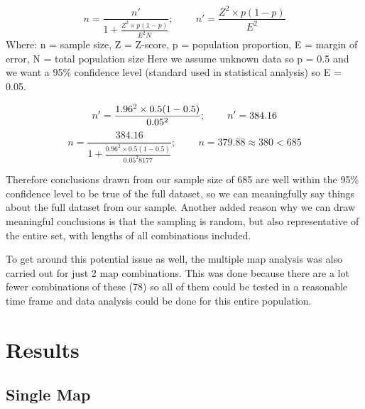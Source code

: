 \documentclass[11pt]{scrartcl}
\begin{document}
\begin{equation}
n = \frac{n'}{1 + \frac{Z^2 \times p(1-p)}{E^2 N}}; \; \; \; \; \; \; \; \;
n' = \frac{Z^2 \times p(1-p)}{E^2}
\end{equation}
Where: n = sample size, Z = Z-score, p = population proportion, E = margin of error, N = total population size
Here we assume unknown data so p = 0.5 and we want a 95\% confidence level (standard used in statistical analysis) so E = 0.05. 

\begin{equation}
n' = \frac{1.96^2 \times 0.5(1-0.5)}{0.05^2}; \; \; \; \; \; \; \; \;
n' = 384.16 \newline
\end{equation}
\begin{equation}
n = \frac{384.16}{1 + \frac{0.96^2 \times 0.5(1-0.5)}{0.05^2 8177}}; \; \; \; \; \; \; \; \;
n = 379.88 \approx 380 < 685
\end{equation}

Therefore conclusions drawn from our sample size of 685 are well within the 95\% confidence level to be true of the full dataset, so we can meaningfully say things about the full dataset from our sample. Another added reason why we can draw meaningful conclusions is that the sampling is random, but also representative of the entire set, with lengths of all combinations included.

To get around this potential issue as well, the multiple map analysis was also carried out for just 2 map combinations. This was done because there are a lot fewer combinations of these (78) so all of them could be tested in a reasonable time frame and data analysis could be done for this entire population.


\section{Results}

\subsection{Single Map}
\end{document}
